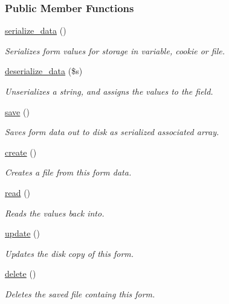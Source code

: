 \subsubsection*{Public Member Functions}
\begin{DoxyCompactItemize}
\item 
\hyperlink{classfile__form_a242c4711e97a3a9062ecbc4dfce8d2e0}{serialize\-\_\-data} ()
\begin{DoxyCompactList}\small\item\em Serializes form values for storage in variable, cookie or file. \end{DoxyCompactList}\item 
\hyperlink{classfile__form_a8b8ee5ff11a467aa1411355604c40904}{deserialize\-\_\-data} (\$s)
\begin{DoxyCompactList}\small\item\em Unserializes a string, and assigns the values to the field. \end{DoxyCompactList}\item 
\hyperlink{classfile__form_a29009ed5d4695a9298f167b17641ae1f}{save} ()
\begin{DoxyCompactList}\small\item\em Saves form data out to disk as serialized associated array. \end{DoxyCompactList}\item 
\hyperlink{classfile__form_a17b09200249a2b5c41261a19693dada8}{create} ()
\begin{DoxyCompactList}\small\item\em Creates a file from this form data. \end{DoxyCompactList}\item 
\hyperlink{classfile__form_ab7dce3d792551f836f20948fa9c8ef13}{read} ()
\begin{DoxyCompactList}\small\item\em Reads the values back into. \end{DoxyCompactList}\item 
\hyperlink{classfile__form_ad9573af92f2b4758204df70c01335f2e}{update} ()
\begin{DoxyCompactList}\small\item\em Updates the disk copy of this form. \end{DoxyCompactList}\item 
\hyperlink{classfile__form_aacbb6b50c48c05a74dd26e8abaee749a}{delete} ()
\begin{DoxyCompactList}\small\item\em Deletes the saved file containg this form. \end{DoxyCompactList}\end{DoxyCompactItemize}

